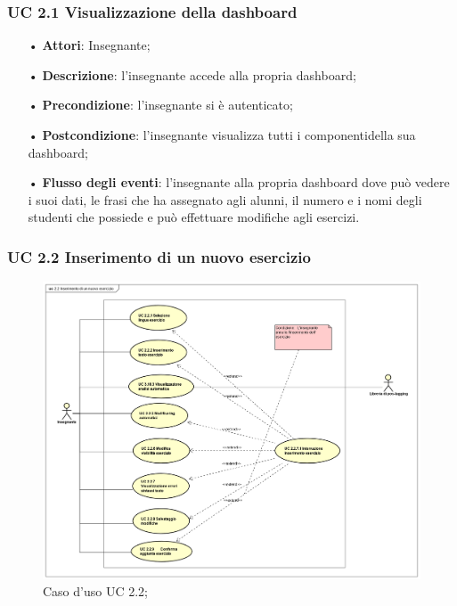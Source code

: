 \subsubsection{UC 2.1 Visualizzazione della dashboard}
\begin{itemize}
	\item[•] \textbf{Attori}: Insegnante;
	\item[•] \textbf{Descrizione}: l’insegnante accede alla propria dashboard;
	\item[•] \textbf{Precondizione}: l'insegnante si è autenticato;
	\item[•] \textbf{Postcondizione}: l'insegnante visualizza tutti i componentidella sua dashboard;
	\item[•] \textbf{Flusso degli eventi}: l’insegnante alla propria dashboard dove può vedere i suoi dati, le frasi che ha assegnato agli alunni, il numero e i nomi degli studenti che possiede e può effettuare modifiche agli esercizi.
\end{itemize}

\subsubsection{UC 2.2 Inserimento di un nuovo esercizio}
\begin{figure}[H]
	\centering
	\includegraphics[width=17cm]{img/UC22.png} 
	\caption{Caso d'uso UC 2.2;}
\end{figure}


